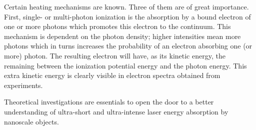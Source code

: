 Certain heating mechanisms are known. Three of them are of great importance. 
First, single- or multi-photon ionization is the absorption by a bound electron 
of one or more photons which promotes this electron to the continuum. This 
mechanism is dependent on the photon density; higher intensities mean more 
photons which in turns increases the probability of an electron absorbing one 
(or more) photon. The resulting electron will have, as its kinetic energy, the 
remaining between the ionization potential energy and the photon energy. This 
extra kinetic energy is clearly visible in electron spectra obtained from 
experiments.



Theoretical investigations are essentials to open the door to a better 
understanding of ultra-short and ultra-intense laser energy absorption by 
nanoscale objects.


